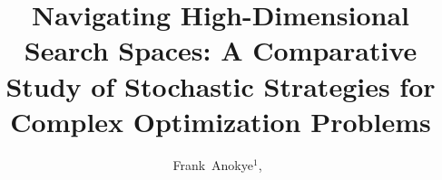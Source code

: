 \documentclass[journal]{IEEEtran}
\begin{document}
    \title{Navigating High-Dimensional Search Spaces: A Comparative Study of Stochastic Strategies for Complex Optimization Problems}
  \author{Frank~Anokye{$^{1}$},~}

\maketitle
\end{document}
